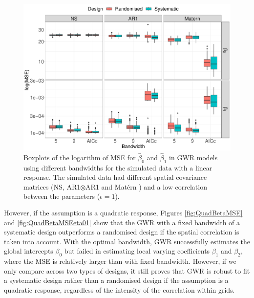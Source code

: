 \documentclass[a4paper]{article} 	%
\newcommand{\Matern}{Mat\'ern }
\begin{document}
\begin{figure}[!htp]
	\centering
	\includegraphics[width=\linewidth]{Expt/Col_LinCombMSE_newpar.pdf}
	\caption{Boxplots of the logarithm of MSE for $\hat{\beta}_0$ and $\hat{\beta}_1$ in GWR models using different bandwidths for the simulated data with a linear response. The simulated data had different spatial covariance matrices (NS, AR1$\otimes$AR1 and \Matern) and a low correlation between the parameters ($\epsilon=1$).}\label{fig:LinBetaMSE}
\end{figure}



However, if the assumption is a quadratic response, Figures \ref{fig:QuadBetaMSE} and \ref{fig:QuadBetaMSEeta01} show that the GWR with a fixed bandwidth of a systematic design outperforms a randomised design if the spatial correlation is taken into account. With the optimal bandwidth, GWR successfully estimates the global intercepts $\beta_0$ but failed in estimating local varying coefficients $\beta_1$ and $\beta_2$, where the MSE is relatively larger than with fixed bandwidth. However, if we only compare across two types of designs, it still proves that GWR is robust to fit a systematic design rather than a randomised design if the assumption is a quadratic response, regardless of the intensity of the correlation within grids. 
\end{document}
